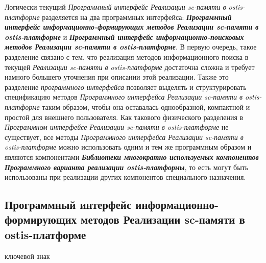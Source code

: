 Логически текущий \textit{Программный интерфейс Реализации sc-памяти в ostis-платформе} разделяется на два программных интерфейса: \textbf{\textit{Программный интерфейс информационно-формирующих методов Реализации sc-памяти в ostis-платформе}} и \textbf{\textit{Программный интерфейс информационно-поисковых методов Реализации sc-памяти в ostis-платформе}}. В первую очередь, такое разделение связано с тем, что реализация методов информационного поиска в текущей \textit{Реализации sc-памяти в ostis-платформе} достаточна сложна и требует намного большего уточнения при описании этой реализации. Также это разделение \textit{программного интерфейса} позволяет выделять и структурировать спецификацию методов \textit{Программного интерфейса Реализации sc-памяти в ostis-платформе} таким образом, чтобы она оставалась однообразной, компактной и простой для внешнего пользователя. Как такового физического разделения в \textit{Программном интерфейсе Реализации sc-памяти в ostis-платформе} не существует, все методы \textit{Программного интерфейса Реализации sc-памяти в ostis-платформе} можно использовать одним и тем же программным образом и являются компонентами \textbf{\textit{Библиотеки многократно используемых компонентов Программного варианта реализации ostis-платформы}}, то есть могут быть использованы при реализации других компонентов специального назначения.

\subsection{Программный интерфейс информационно-формирующих методов Реализации sc-памяти в ostis-платформе}
\label{sec_soft_platform_information_creation_subsystem}

\begin{SCn}

\begin{scnrelfromlist}{ключевой знак}
\end{scnrelfromlist}

\end{SCn}

